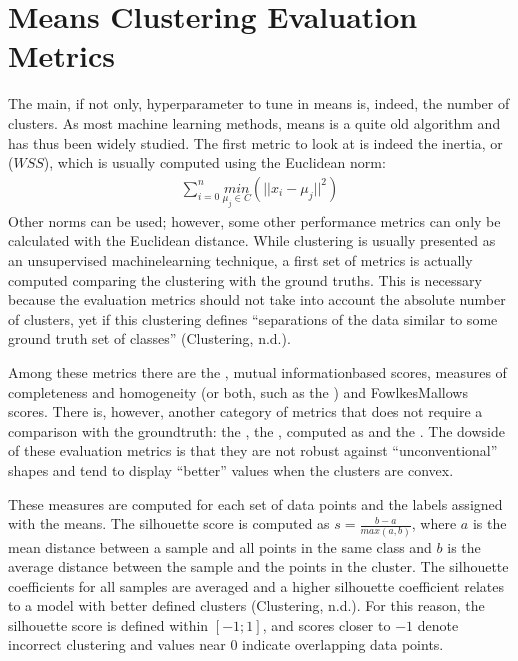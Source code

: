 \documentclass[letterpaper,10pt,english]{jupyterBook}
\begin{document}
\section{\sphinxhyphen{}Means Clustering Evaluation Metrics}
\label{\detokenize{04-stations_kmeans:k-means-clustering-evaluation-metrics}}
\sphinxAtStartPar
The main, if not only, hyperparameter to tune in \sphinxhyphen{}means is, indeed, the number of clusters.
As most machine learning methods, \sphinxhyphen{}means is a quite old algorithm and has thus been widely studied.
The first metric to look at is indeed the inertia, or  (\(WSS\)), which is usually computed using the Euclidean norm:
\begin{equation*}
\begin{split}
\sum_{i=0}^{n}\underset{\mu_{j}\in{C}}{min}(||x_{i} - \mu_{j}||^2)
\end{split}
\end{equation*}
\sphinxAtStartPar
Other norms can be used; however, some other performance metrics can only be calculated with the Euclidean distance. While clustering is usually presented as an unsupervised machine\sphinxhyphen{}learning technique, a first set of metrics is actually computed comparing the clustering with the ground truths. This is necessary because the evaluation metrics should not take into account the absolute number of clusters, yet if this clustering defines “separations of the data similar to some ground truth set of classes” (Clustering, n.d.).

\sphinxAtStartPar
Among these metrics there are the , mutual information\sphinxhyphen{}based scores, measures of completeness and homogeneity (or both, such as the ) and Fowlkes\sphinxhyphen{}Mallows scores. There is, however, another category of metrics that does not require a comparison with the ground\sphinxhyphen{}truth: the , the , computed as  and  the . The dowside of these evaluation metrics is that they are not robust against “unconventional” shapes and tend to display “better” values when the clusters are convex.

\sphinxAtStartPar
These measures are computed for each set of data points and the labels assigned with the \sphinxhyphen{}means. The silhouette score is computed as \(s = \frac{b - a}{max(a, b)}\), where \(a\) is the mean distance between a sample and all points in the same class and \(b\) is the average distance between the sample and the points in the  cluster. The silhouette coefficients for all samples are averaged and a higher silhouette coefficient relates to a model with better defined clusters (Clustering, n.d.). For this reason, the silhouette score is defined within \([-1;1]\), and scores closer to \(-1\) denote incorrect clustering and values near \(0\) indicate overlapping data points.
\end{document}
